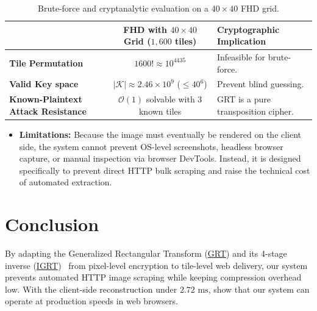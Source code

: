 \documentclass{article}
\begin{document}
\begin{table}[H]
\centering
\footnotesize
\begin{tabularx}{\textwidth}{l c >{\raggedright\arraybackslash}X}
\toprule
\textbf{} & \textbf{FHD with $40 \times 40$ Grid ($1,600$ tiles)} & \textbf{Cryptographic Implication} \\
\midrule
\textbf{Tile Permutation} & $1600! \approx 10^{4435}$ & Infeasible for brute-force. \\
\addlinespace
\textbf{Valid Key space} & $|\mathcal{K}| \approx 2.46 \times 10^9$ ($\le 40^6$) & Prevent blind guessing. \\
\addlinespace
\textbf{Known-Plaintext Attack Resistance} & $\mathcal{O}(1)$ solvable with 3 known tiles & GRT is a pure transposition cipher. \\
\bottomrule
\end{tabularx}
\caption{Brute-force and cryptanalytic evaluation on a $40 \times 40$ FHD grid.}
\label{tab:bruteforce}
\end{table}

\begin{itemize}

    \item \textbf{Limitations:} Because the image must eventually be rendered on the client side, the system cannot prevent OS-level screenshots, headless browser capture, or manual inspection via browser DevTools. Instead, it is designed specifically to prevent direct HTTP bulk scraping and raise the technical cost of automated extraction.
    
\end{itemize}

\section{Conclusion}
By adapting the Generalized Rectangular Transform (\hyperref[sec:GRT]{GRT}) and its 4-stage inverse (\hyperref[sec:IGRT]{IGRT})~\cite{Lan2025ANM} from pixel-level encryption to tile-level web delivery, our system prevents automated HTTP image scraping while keeping compression overhead low. With the client-side reconstruction under $2.72\text{ ms}$, show that our system can operate at production speeds in web browsers.



\newpage
\end{document}
